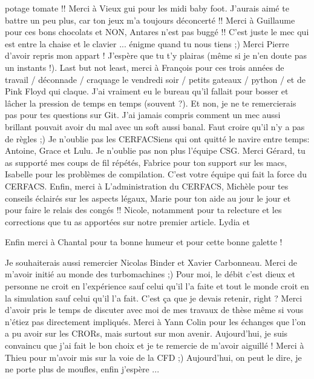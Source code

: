 potage tomate !! Merci à Vieux gui pour les midi baby foot. J'aurais aimé
te battre un peu plus, car ton jeux m'a toujours déconcerté !! 
Merci à Guillaume pour ces bons chocolats et NON, Antares n'est pas buggé !!
C'est juste le mec qui est entre la chaise et le clavier ... 
énigme quand tu nous tiens ;) 
Merci Pierre d'avoir repris mon appart ! J'espère que tu t'y plairas
(même si je n'en doute pas un instants !).
Last but not least, merci à François pour ces
trois années de travail / déconnade / craquage le vendredi soir / 
petits gateaux / python / et de Pink Floyd qui claque. J'ai vraiment
eu le bureau qu'il fallait pour bosser et lâcher la pression de temps
en temps (souvent ?). Et non, je ne te remercierais pas
pour tes questions sur Git. J'ai jamais compris comment 
un mec aussi brillant pouvait avoir du mal
avec un soft aussi banal. Faut croire qu'il n'y a pas de règles ;)
Je n'oublie pas les CERFACSiens qui ont quitté le navire entre temps:
Antoine, Grace et Lulu.
Je n'oublie pas non plus l'équipe CSG. Merci Gérard,
tu as supporté mes coups de fil répétés, Fabrice pour ton
support sur les macs, Isabelle pour les problèmes de
compilation. C'est votre équipe qui fait la force du CERFACS.
Enfin, merci à L'administration du CERFACS, Michèle pour tes
conseils éclairés sur les aspects légaux, Marie pour
ton aide au jour le jour et pour faire le relais des 
congés !! Nicole, notamment pour ta relecture et les
corrections que tu as apportées sur notre premier
article. Lydia et 

Enfin merci à Chantal pour ta bonne humeur et pour 
cette bonne galette ! 

Je souhaiterais aussi remercier Nicolas Binder et
Xavier Carbonneau. 
Merci de m'avoir initié au monde des turbomachines ;) Pour moi,
le débit c'est dieux et personne ne croit en l'expérience
sauf celui qu'il l'a faite et tout le monde croit en la
simulation sauf celui qu'il l'a fait. 
C'est ça que je devais retenir, right ?
Merci d'avoir pris le temps de 
discuter avec moi de mes travaux de thèse même si
vous n'étiez pas directement impliqués.
Merci à Yann Colin pour les échanges que l'on a pu avoir
sur les CRORs, mais surtout sur mon avenir. Aujourd'hui,
je suis convaincu que j'ai fait le bon choix et je te remercie
de m'avoir aiguillé !
Merci à Thieu pour m'avoir mis sur la voie de la CFD ;)
Aujourd'hui, on peut le dire, je ne porte plus de moufles, enfin
j'espère ...

